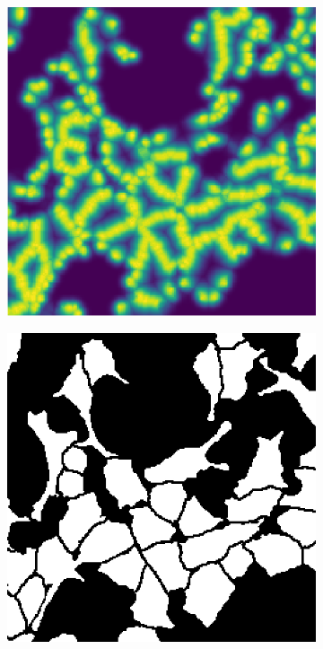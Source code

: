 \documentclass[10pt, journal, compsoc]{IEEEtran}
\begin{document}
\begin{figure}
\centering
\begin{subfigure}[b]{0.49\linewidth}
\includegraphics[width=\linewidth]{weights/110115-wmap.eps}
\end{subfigure}
\begin{subfigure}[b]{0.49\linewidth}
\includegraphics[width=\linewidth]{unet/110115.jpg}

\end{subfigure}
\end{figure}
\end{document}
